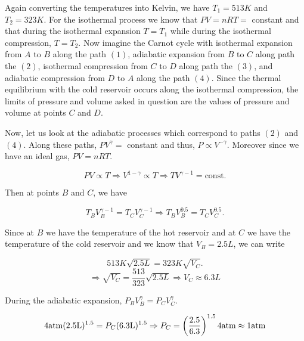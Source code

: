         Again converting the temperatures into Kelvin, we have $T_1 = 513\si{K}$ and $T_2 = 323\si{K}$. For the isothermal process we know that $PV=nRT=$ constant and that during the isothermal expansion $T=T_1$ while during the isothermal compression, $T=T_2$. Now imagine the Carnot cycle with isothermal expansion from $A$ to $B$ along the path $(1)$, adiabatic expansion from $B$ to $C$ along path the $(2)$, isothermal compression from $C$ to $D$ along path the $(3)$, and adiabatic compression from $D$ to $A$ along the path $(4)$. Since the thermal equilibrium with the cold reservoir occurs along the isothermal compression, the limits of pressure and volume asked in question are the values of pressure and volume at points $C$ and $D$. 
        
        Now, let us look at the adiabatic processes which correspond to paths $(2)$ and $(4)$. Along these paths, $PV^\gamma =$ constant and thus, $P \propto V^{-\gamma}$. Moreover since we have an ideal gas, $PV = nRT$. 
        
        \begin{equation}
            PV \propto T \Rightarrow V^{1-\gamma} \propto T \Rightarrow TV^{\gamma-1} = \text{const}.
        \end{equation}
        
        Then at points $B$ and $C$, we have
        
        \begin{equation}
            T_BV_B^{\gamma-1} = T_CV_C^{\gamma-1} \Rightarrow T_BV_B^{0.5} = T_CV_C^{0.5}.
        \end{equation}
        
        Since at $B$ we have the temperature of the hot reservoir and at $C$ we have the temperature of the cold reservoir and we know that $V_B = 2.5\si{L}$, we can write
        
        \begin{equation}
            513\si{K}\sqrt{2.5\si{L}} = 323\si{K}\sqrt{V_C}.
        \end{equation}
        \begin{equation}
            \Rightarrow \sqrt{V_C} = \frac{513}{323}\sqrt{2.5\si{L}} \Rightarrow V_C \approx 6.3\si{L}
        \end{equation}
        
        During the adiabatic expansion, $P_BV_B^\gamma = P_CV_C^\gamma$. 
        
        \begin{equation}
            4\si{atm}(2.5\si{L})^{1.5} = P_C(6.3\si{L})^{1.5}\Rightarrow P_C = \lrp{\frac{2.5}{6.3}}^{1.5}4\si{atm} \approx 1\si{atm}
        \end{equation}
        
